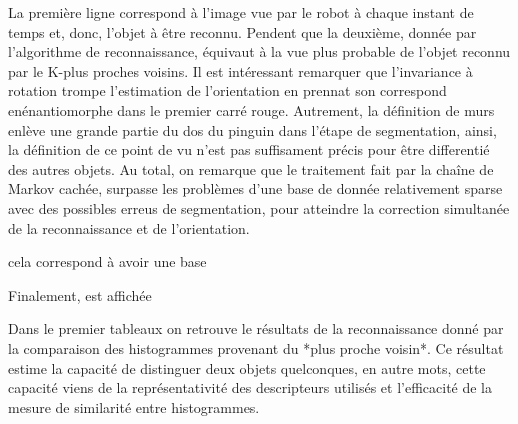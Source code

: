 La première ligne correspond à l'image vue par le robot à chaque instant de temps et, donc, l'objet à être reconnu. Pendent que la deuxième, donnée par l'algorithme de reconnaissance, équivaut à la vue plus probable de l'objet reconnu par le K-plus proches voisins. Il est intéressant remarquer que l'invariance à rotation trompe l'estimation de l'orientation en prennat son correspond enénantiomorphe dans le premier carré rouge. Autrement, la définition de murs enlève une grande partie du dos du pinguin dans l'étape de segmentation, ainsi, la définition de ce point de vu n'est pas suffisament précis pour être differentié des autres objets. Au total, on remarque que le traitement fait par la chaîne de Markov cachée, surpasse les problèmes d'une base de donnée relativement sparse avec des possibles erreus de segmentation, pour atteindre la correction simultanée de la reconnaissance et de l'orientation. 

cela correspond à avoir une base

Finalement,  est affichée

\begin{figure}[H]
\end{figure}


{\color{green}
Dans le premier tableaux on retrouve le résultats de la reconnaissance donné par la comparaison des histogrammes provenant du *plus proche voisin*. Ce résultat estime la capacité de distinguer deux objets quelconques, en autre mots, cette capacité viens de la représentativité des descripteurs utilisés et l'efficacité de la mesure de similarité entre histogrammes.
}
